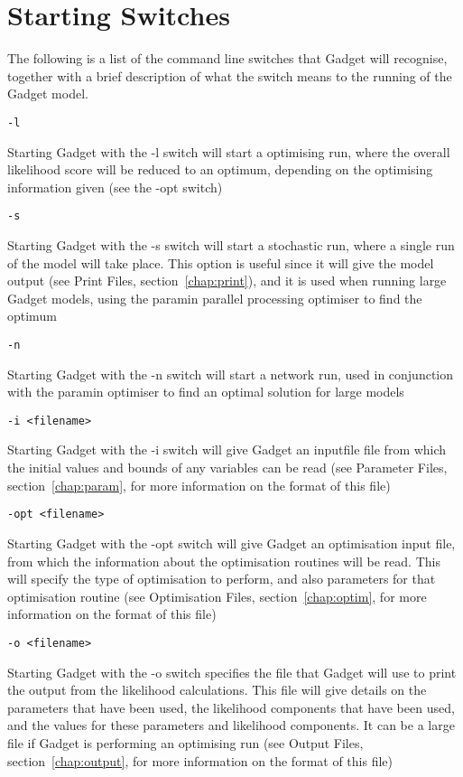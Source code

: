 \documentclass [a4paper, 10pt]{book}
\begin{document}
\section{Starting Switches}\label{sec:starting}
The following is a list of the command line switches that Gadget will recognise, together with a brief description of what the switch means to the running of the Gadget model.

\begin{verbatim}
-l
\end{verbatim}
Starting Gadget with the -l switch will start a optimising run, where the overall likelihood score will be reduced to an optimum, depending on the optimising information given (see the -opt switch)

\begin{verbatim}
-s
\end{verbatim}
Starting Gadget with the -s switch will start a stochastic run, where a single run of the model will take place.  This option is useful since it will give the model output (see Print Files, section~\ref{chap:print}), and it is used when running large Gadget models, using the paramin parallel processing optimiser to find the optimum

\begin{verbatim}
-n
\end{verbatim}
Starting Gadget with the -n switch will start a network run, used in conjunction with the paramin optimiser to find an optimal solution for large models

\begin{verbatim}
-i <filename>
\end{verbatim}
Starting Gadget with the -i switch will give Gadget an inputfile file from which the initial values and bounds of any variables can be read (see Parameter Files, section~\ref{chap:param}, for more information on the format of this file)

\begin{verbatim}
-opt <filename>
\end{verbatim}
Starting Gadget with the -opt switch will give Gadget an optimisation input file, from which the information about the optimisation routines will be read.  This will specify the type of optimisation to perform, and also parameters for that optimisation routine (see Optimisation Files, section~\ref{chap:optim}, for more information on the format of this file)

\begin{verbatim}
-o <filename>
\end{verbatim}
Starting Gadget with the -o switch specifies the file that Gadget will use to print the output from the likelihood calculations.  This file will give details on the parameters that have been used, the likelihood components that have been used, and the values for these parameters and likelihood components.  It can be a large file if Gadget is performing an optimising run (see Output Files, section~\ref{chap:output}, for more information on the format of this file)
\end{document}
